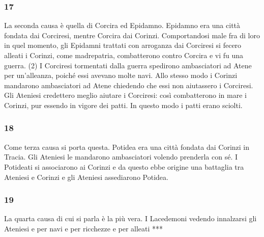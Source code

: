 \subsubsection*{17} La seconda causa è quella di Corcira ed Epidamno. Epidamno era una città fondata dai Corciresi, mentre Corcira dai Corinzi. Comportandosi male fra di loro in quel momento, gli Epidamni trattati con arroganza dai Corciresi si fecero alleati i Corinzi, come madrepatria, combatterono contro Corcira e vi fu una guerra. (2) I Corciresi tormentati dalla guerra spedirono ambasciatori ad Atene per un'alleanza, poiché essi avevano molte navi. Allo stesso modo i Corinzi mandarono ambasciatori ad Atene chiedendo che essi non aiutassero i Corciresi. Gli Ateniesi credettero meglio aiutare i Corciresi: così combatterono in mare i Corinzi, pur essendo in vigore dei patti. In questo modo i patti erano sciolti.

\subsubsection*{18} Come terza causa si porta questa. Potidea era una città fondata dai Corinzi in Tracia. Gli Ateniesi le mandarono ambasciatori volendo prenderla con sé. I Potideati si associarono ai Corinzi e da questo ebbe origine una battaglia tra Ateniesi e Corinzi e gli Ateniesi assediarono Potidea.

\subsubsection*{19} La quarta causa di cui si parla è la più vera. I Lacedemoni vedendo innalzarsi gli Ateniesi e per navi e per ricchezze e per alleati ***